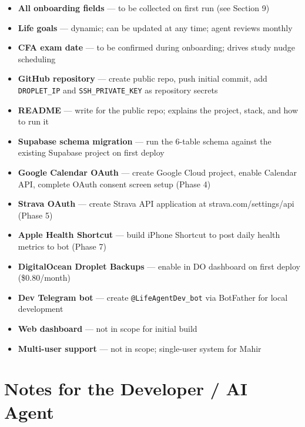 \documentclass[12pt, a4paper]{article}
\begin{document}
\begin{itemize}[noitemsep]
    \item \textbf{All onboarding fields} --- to be collected on first run (see Section 9)
    \item \textbf{Life goals} --- dynamic; can be updated at any time; agent reviews monthly
    \item \textbf{CFA exam date} --- to be confirmed during onboarding; drives study nudge scheduling
    \item \textbf{GitHub repository} --- create public repo, push initial commit, add \texttt{DROPLET\_IP} and \texttt{SSH\_PRIVATE\_KEY} as repository secrets
    \item \textbf{README} --- write for the public repo; explains the project, stack, and how to run it
    \item \textbf{Supabase schema migration} --- run the 6-table schema against the existing Supabase project on first deploy
    \item \textbf{Google Calendar OAuth} --- create Google Cloud project, enable Calendar API, complete OAuth consent screen setup (Phase 4)
    \item \textbf{Strava OAuth} --- create Strava API application at strava.com/settings/api (Phase 5)
    \item \textbf{Apple Health Shortcut} --- build iPhone Shortcut to post daily health metrics to bot (Phase 7)
    \item \textbf{DigitalOcean Droplet Backups} --- enable in DO dashboard on first deploy (\$0.80/month)
    \item \textbf{Dev Telegram bot} --- create \texttt{@LifeAgentDev\_bot} via BotFather for local development
    \item \textbf{Web dashboard} --- not in scope for initial build
    \item \textbf{Multi-user support} --- not in scope; single-user system for Mahir
\end{itemize}

\section{Notes for the Developer / AI Agent}
\end{document}
